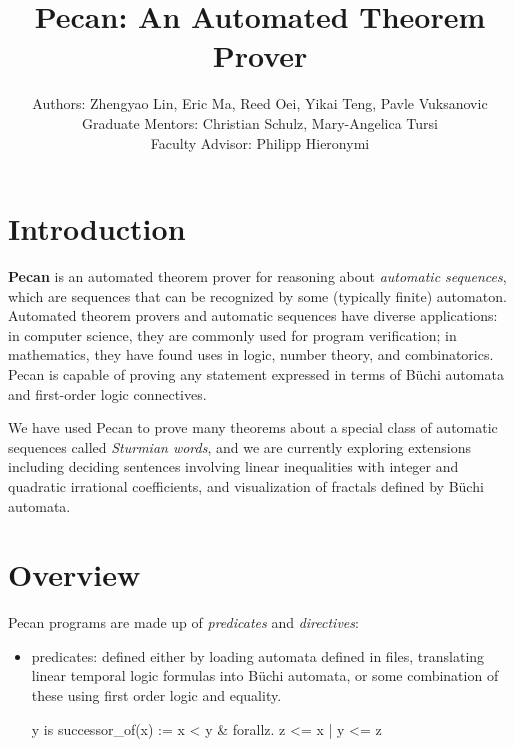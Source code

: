 \documentclass[landscape,usenames,dvipsnames]{sciposter}
\title{Pecan: An Automated Theorem Prover}
\author{
Authors: Zhengyao Lin, Eric Ma, Reed Oei, Yikai Teng, Pavle Vuksanovic \\
Graduate Mentors: Christian Schulz, Mary-Angelica Tursi \\
Faculty Advisor: Philipp Hieronymi}
\begin{document}

\maketitle
\vspace{-3ex}
\begin{multicols}{3}  %



\section*{Introduction}

\textbf{Pecan} is an automated theorem prover for reasoning about \emph{automatic sequences}, which are sequences that can be recognized by some (typically finite) automaton.
Automated theorem provers and automatic sequences have diverse applications: in computer science, they are commonly used for program verification; in mathematics, they have found uses in logic, number theory, and combinatorics. Pecan is capable of proving any statement expressed in terms of B\"uchi automata and first-order logic connectives.

We have used Pecan to prove many theorems about a special class of automatic sequences called \emph{Sturmian words}, and we are currently exploring extensions including deciding sentences involving linear inequalities with integer and quadratic irrational coefficients, and
visualization of fractals defined by B\"uchi automata.

\section*{Overview}

Pecan programs are made up of \emph{predicates} and \emph{directives}:

\begin{itemize}
    \item predicates: defined either by loading automata defined in files, translating linear temporal logic formulas into B\"uchi automata, or some combination of these using first order logic and equality.
\begin{pecan}
y is successor_of(x) := x < y & forallz. z <= x | y <= z
\end{pecan}


\end{itemize}
\end{multicols}
\end{document}
